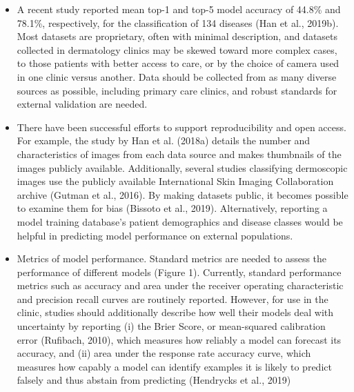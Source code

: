\documentclass[12pt, a4paper, oneside]{book}   	%
\begin{document}
\begin{itemize}
				
				\item A recent study reported mean top-1 and top-5 model accuracy of 44.8\% and 78.1\%, respectively, for the classification of 134 diseases (Han et al., 2019b). Most datasets are proprietary, often with minimal description, and datasets collected in dermatology clinics may be skewed toward more complex cases, to those patients with better access to care, or by the choice of camera used in one clinic versus another. Data should be collected from as many diverse sources as possible, including primary care clinics, and robust standards for external validation are needed. \autocite{Young_2020}
				\item There have been successful efforts to support reproducibility and open access. For example, the study by Han et al. (2018a) details the number and characteristics of images from each data source and makes thumbnails of the images publicly available. Additionally, several studies classifying dermoscopic images use the publicly available International Skin Imaging Collaboration archive (Gutman et al., 2016). By making datasets public, it becomes possible to examine them for bias (Bissoto et al., 2019). Alternatively, reporting a model training database’s patient demographics and disease classes would be helpful in predicting model performance on external populations. \autocite{Young_2020}
				\item Metrics of model performance. Standard metrics are needed to assess the performance of different models (Figure 1). Currently, standard performance metrics such as accuracy and area under the receiver operating characteristic and precision recall curves are routinely reported. However, for use in the clinic, studies should additionally describe how well their models deal with uncertainty by reporting (i) the Brier Score, or mean-squared calibration error (Rufibach, 2010), which measures how reliably a model can forecast its accuracy, and (ii) area under the response rate accuracy curve, which measures how capably a model can identify examples it is likely to predict falsely and thus abstain from predicting (Hendrycks et al., 2019) \autocite{Young_2020}

\end{itemize}
\end{document}
